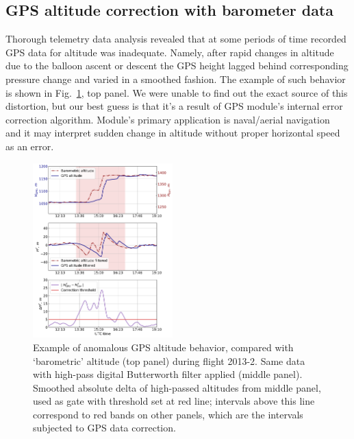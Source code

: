 \documentclass[final,5p,times,twocolumn]{elsarticle}
\begin{document}
\subsection{GPS altitude correction with barometer data}
\label{sect:gps_correction}

Thorough telemetry data analysis revealed that at some periods of time recorded GPS data for altitude was inadequate. Namely, after rapid changes in altitude due to the balloon ascent or descent the GPS height lagged behind corresponding pressure change and varied in a smoothed fashion. The example of such behavior is shown in Fig.~\ref{fig:h_corr}, top panel. We were unable to find out the exact source of this distortion, but our best guess is that it's a result of GPS module's internal error correction algorithm. Module's primary application is naval/aerial navigation~\cite{GPS-module-specs} and it may interpret sudden change in altitude without proper horizontal speed as an error.

\begin{figure}[tb]
    \includegraphics[width=0.48\textwidth]{height_correction.pdf} 
    \caption{Example of anomalous GPS altitude behavior, compared with `barometric' altitude (top panel) during flight 2013-2. Same data with high-pass digital Butterworth filter applied (middle panel). Smoothed absolute delta of high-passed altitudes from middle panel, used as gate with threshold set at red line; intervals above this line correspond to red bands on other panels, which are the intervals subjected to GPS data correction.}
\label{fig:h_corr}
\end{figure}
\end{document}
